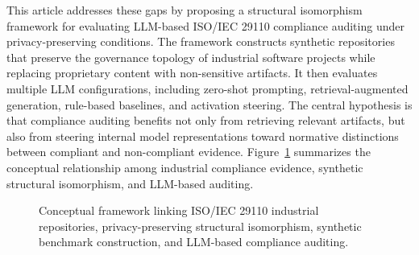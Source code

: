 \documentclass{ieeeaccess}
\begin{document}
This article addresses these gaps by proposing a structural isomorphism framework for evaluating LLM-based ISO/IEC 29110 compliance auditing under privacy-preserving conditions. The framework constructs synthetic repositories that preserve the governance topology of industrial software projects while replacing proprietary content with non-sensitive artifacts. It then evaluates multiple LLM configurations, including zero-shot prompting, retrieval-augmented generation, rule-based baselines, and activation steering. The central hypothesis is that compliance auditing benefits not only from retrieving relevant artifacts, but also from steering internal model representations toward normative distinctions between compliant and non-compliant evidence. Figure~\ref{fig:conceptual_framework} summarizes the conceptual relationship among industrial compliance evidence, synthetic structural isomorphism, and LLM-based auditing.

\begin{figure}[!t]
\centering
{}
\caption{Conceptual framework linking ISO/IEC 29110 industrial repositories, privacy-preserving structural isomorphism, synthetic benchmark construction, and LLM-based compliance auditing.}
\label{fig:conceptual_framework}
\end{figure}
\end{document}
